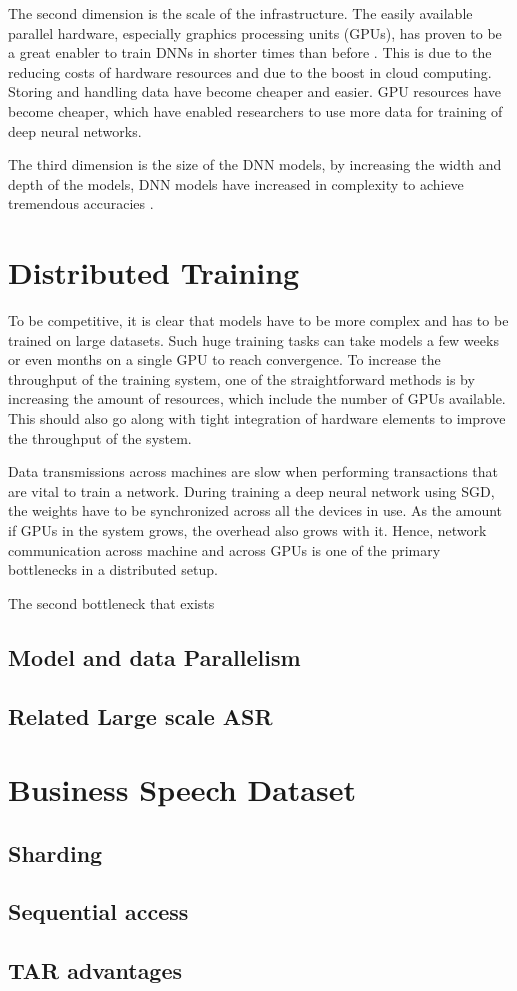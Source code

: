 The second dimension is the scale of the infrastructure. The easily available parallel hardware, especially graphics processing units (GPUs), has proven to be a great enabler to train DNNs in shorter times than before \cite{ZhangPoseidon:Clusters}. This is due to the reducing costs of hardware resources and due to the boost in cloud computing. Storing and handling data have become cheaper and easier. GPU resources have become cheaper, which have enabled researchers to use more data for training of deep neural networks. 

The third dimension is the size of the DNN models, by increasing the width and depth of the models, DNN models have increased in complexity to achieve tremendous accuracies \cite{DeanLargeNetworks}. 

\section{Distributed Training}
To be competitive, it is clear that models have to be more complex and has to be trained on large datasets. Such huge training tasks can take models a few weeks or even months on a single GPU to reach convergence. To increase the throughput of the training system, one of the straightforward  methods is by increasing the amount of resources, which include the number of GPUs available. This should also go along with tight integration of hardware elements to improve the throughput of the system. \cite{Langer2020DistributedPerspective}

Data transmissions across machines are slow when performing transactions that are vital to train a network. During training a deep neural network using SGD, the weights have to be synchronized across all the devices in use. As the amount if GPUs in the system grows, the overhead also grows with it. Hence, network communication across machine and across GPUs is one of the primary bottlenecks in a distributed setup.  \cite{Langer2020DistributedPerspective}

The second bottleneck that exists
\subsection{Model and data Parallelism}

\subsection{Related Large scale ASR}

\section{Business Speech Dataset}

\subsection{Sharding}
\subsection{Sequential access}
\subsection{TAR advantages}

